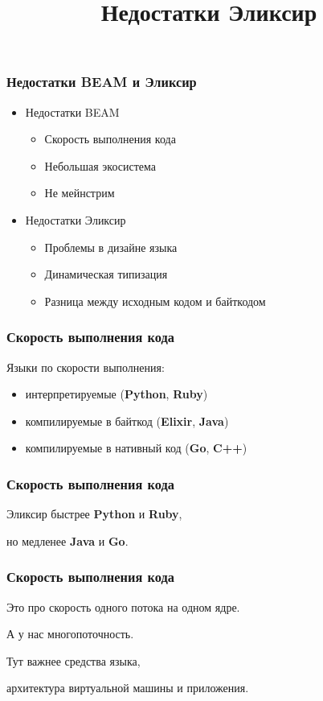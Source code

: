 \documentclass[10pt,xcolor=x11names]{beamer}
\title{Недостатки Эликсир}
\begin{document}
\begin{frame}
  \frametitle{Недостатки BEAM и Эликсир}
  \begin{itemize}
  \item Недостатки BEAM
    \begin{itemize}
    \item Скорость выполнения кода
    \item Небольшая экосистема
    \item Не мейнстрим
    \end{itemize}
  \item Недостатки Эликсир
    \begin{itemize}
    \item Проблемы в дизайне языка
    \item Динамическая типизация
    \item Разница между исходным кодом и байткодом
    \end{itemize}
  \end{itemize}
\end{frame}

\begin{frame}
  \frametitle{Скорость выполнения кода}
  Языки по скорости выполнения:
  \begin{itemize}
  \item интерпретируемые (\textbf{Python}, \textbf{Ruby})
  \item компилируемые в байткод (\textbf{Elixir}, \textbf{Java})
  \item компилируемые в нативный код (\textbf{Go}, \textbf{C++})
  \end{itemize}
\end{frame}

\begin{frame}
  \frametitle{Скорость выполнения кода}
  Эликсир быстрее \textbf{Python} и \textbf{Ruby},
  \par \bigskip
  но медленее \textbf{Java} и \textbf{Go}.
\end{frame}

\begin{frame}
  \frametitle{Скорость выполнения кода}
  Это про скорость одного потока на одном ядре.
  \par \bigskip
  А у нас многопоточность.
  \par \bigskip
  Тут важнее средства языка,
  \par \bigskip
  архитектура виртуальной машины и приложения.
\end{frame}
\end{document}
